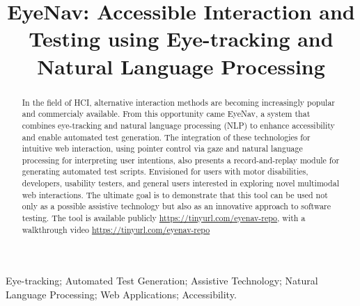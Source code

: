\documentclass[10pt, conference]{IEEEtran}
\begin{document}
\title{EyeNav: Accessible Interaction and Testing using Eye-tracking and Natural Language Processing}

\author{
}

\maketitle

\begin{abstract}
In the field of \ac{HCI}, alternative interaction methods are becoming increasingly popular and commercialy available. From this opportunity came EyeNav, a system that combines eye-tracking and natural language processing (NLP) to enhance accessibility and enable automated test generation. The integration of these technologies for intuitive web interaction, using pointer control via gaze and natural language processing for interpreting user intentions, also presents a record-and-replay module for generating automated test scripts. Envisioned for users with motor disabilities, developers, usability testers, and general users interested in exploring novel multimodal web interactions. %
The ultimate goal is to demonstrate that this tool can be used not only as a possible assistive technology but also as an innovative approach to software testing. The tool is available publicly \href{https://tinyurl.com/eyenav-repo}{https://tinyurl.com/eyenav-repo}, with a walkthrough video \href{https://tinyurl.com/eyenav-repo}{https://tinyurl.com/eyenav-repo} %
\end{abstract}


\begin{IEEEkeywords}
Eye-tracking; Automated Test Generation; Assistive Technology; Natural Language Processing; Web Applications; Accessibility.
\end{IEEEkeywords}
\end{document}
